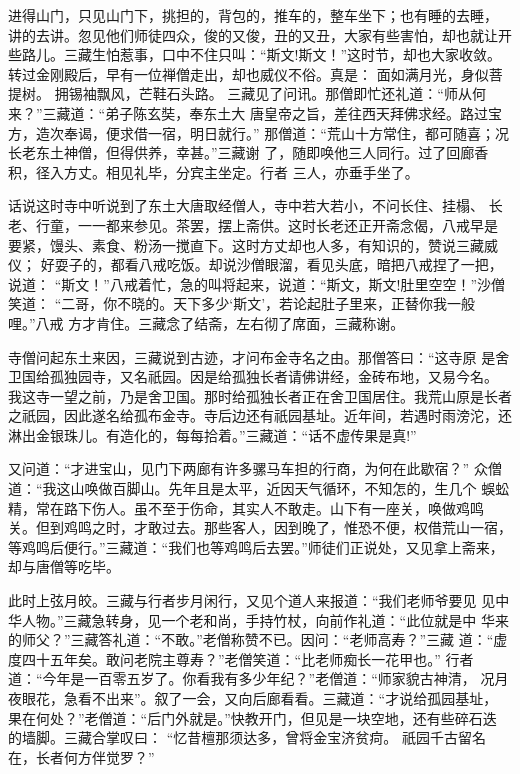 进得山门，只见山门下，挑担的，背包的，推车的，整车坐下；也有睡的去睡，
讲的去讲。忽见他们师徒四众，俊的又俊，丑的又丑，大家有些害怕，却也就让开
些路儿。三藏生怕惹事，口中不住只叫：“斯文!斯文！”这时节，却也大家收敛。
转过金刚殿后，早有一位禅僧走出，却也威仪不俗。真是：
面如满月光，身似菩提树。
拥锡袖飘风，芒鞋石头路。
三藏见了问讯。那僧即忙还礼道：“师从何来？”三藏道：“弟子陈玄奘，奉东土大
唐皇帝之旨，差往西天拜佛求经。路过宝方，造次奉谒，便求借一宿，明日就行。”
那僧道：“荒山十方常住，都可随喜；况长老东土神僧，但得供养，幸甚。”三藏谢
了，随即唤他三人同行。过了回廊香积，径入方丈。相见礼毕，分宾主坐定。行者
三人，亦垂手坐了。

话说这时寺中听说到了东土大唐取经僧人，寺中若大若小，不问长住、挂榻、
长老、行童，一一都来参见。茶罢，摆上斋供。这时长老还正开斋念偈，八戒早是
要紧，馒头、素食、粉汤一搅直下。这时方丈却也人多，有知识的，赞说三藏威仪；
好耍子的，都看八戒吃饭。却说沙僧眼溜，看见头底，暗把八戒捏了一把，说道：
“斯文！”八戒着忙，急的叫将起来，说道：“斯文，斯文!肚里空空！”沙僧笑道：
“二哥，你不晓的。天下多少‘斯文’，若论起肚子里来，正替你我一般哩。”八戒
方才肯住。三藏念了结斋，左右彻了席面，三藏称谢。

寺僧问起东土来因，三藏说到古迹，才问布金寺名之由。那僧答曰：“这寺原
是舍卫国给孤独园寺，又名祇园。因是给孤独长者请佛讲经，金砖布地，又易今名。
我这寺一望之前，乃是舍卫国。那时给孤独长者正在舍卫国居住。我荒山原是长者
之祇园，因此遂名给孤布金寺。寺后边还有祇园基址。近年间，若遇时雨滂沱，还
淋出金银珠儿。有造化的，每每拾着。”三藏道：“话不虚传果是真!”

又问道：“才进宝山，见门下两廊有许多骡马车担的行商，为何在此歇宿？”
众僧道：“我这山唤做百脚山。先年且是太平，近因天气循环，不知怎的，生几个
蜈蚣精，常在路下伤人。虽不至于伤命，其实人不敢走。山下有一座关，唤做鸡鸣
关。但到鸡鸣之时，才敢过去。那些客人，因到晚了，惟恐不便，权借荒山一宿，
等鸡鸣后便行。”三藏道：“我们也等鸡鸣后去罢。”师徒们正说处，又见拿上斋来，
却与唐僧等吃毕。

此时上弦月皎。三藏与行者步月闲行，又见个道人来报道：“我们老师爷要见
见中华人物。”三藏急转身，见一个老和尚，手持竹杖，向前作礼道：“此位就是中
华来的师父？”三藏答礼道：“不敢。”老僧称赞不已。因问：“老师高寿？”三藏
道：“虚度四十五年矣。敢问老院主尊寿？”老僧笑道：“比老师痴长一花甲也。”
行者道：“今年是一百零五岁了。你看我有多少年纪？”老僧道：“师家貌古神清，
况月夜眼花，急看不出来”。叙了一会，又向后廊看看。三藏道：“才说给孤园基址，
果在何处？”老僧道：“后门外就是。”快教开门，但见是一块空地，还有些碎石迭
的墙脚。三藏合掌叹曰：
“忆昔檀那须达多，曾将金宝济贫疴。
祇园千古留名在，长者何方伴觉罗？”

